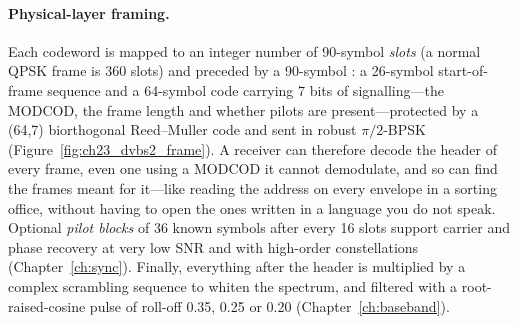 \paragraph{Physical-layer framing.} Each codeword is mapped to an integer number of 90-symbol
\emph{slots} (a normal QPSK frame is 360 slots) and preceded by a 90-symbol : a
26-symbol start-of-frame sequence and a 64-symbol code carrying 7 bits of signalling---the
MODCOD, the frame length and whether pilots are present---protected by a (64,7) biorthogonal
Reed--Muller code and sent in robust $\pi/2$-BPSK (Figure~\ref{fig:ch23_dvbs2_frame}). A receiver
can therefore decode the header of every frame, even one using a MODCOD it cannot demodulate, and
so can find the frames meant for it---like reading the address on every envelope in a sorting
office, without having to open the ones written in a language you do not speak. Optional
\emph{pilot blocks} of 36 known symbols after every 16 slots support carrier and phase recovery at
very low SNR and with high-order constellations (Chapter~\ref{ch:sync}). Finally, everything after
the header is multiplied by a complex scrambling sequence to whiten the spectrum, and filtered with
a root-raised-cosine pulse of roll-off 0.35, 0.25 or 0.20 (Chapter~\ref{ch:baseband}).



